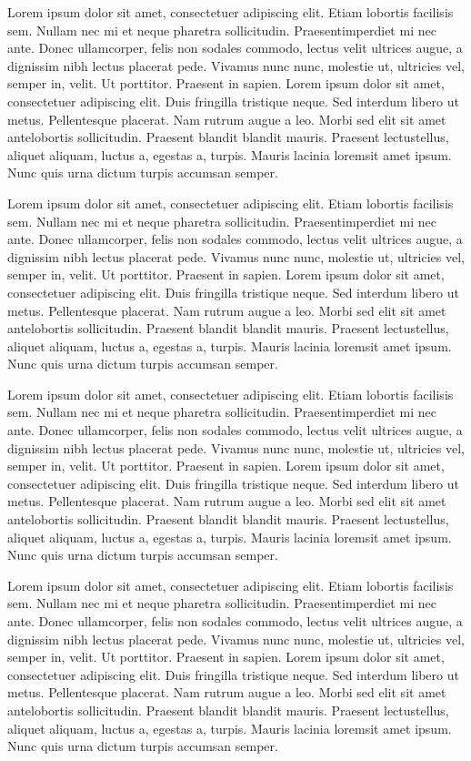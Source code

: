 Lorem ipsum dolor sit amet, consectetuer adipiscing elit. Etiam lobortis facilisis sem. Nullam nec mi et neque pharetra sollicitudin. Praesentimperdiet mi nec ante. Donec ullamcorper, felis non sodales commodo, lectus velit ultrices augue, a dignissim nibh lectus placerat pede. Vivamus nunc nunc, molestie ut, ultricies vel, semper in, velit. Ut porttitor. Praesent in sapien. Lorem ipsum dolor sit amet, consectetuer adipiscing elit. Duis fringilla tristique neque. Sed interdum libero ut metus. Pellentesque placerat. Nam rutrum augue a leo. Morbi sed elit sit amet antelobortis sollicitudin. Praesent blandit blandit mauris. Praesent lectustellus, aliquet aliquam, luctus a, egestas a, turpis. Mauris lacinia loremsit amet ipsum. Nunc quis urna dictum turpis accumsan semper.

Lorem ipsum dolor sit amet, consectetuer adipiscing elit. Etiam lobortis facilisis sem. Nullam nec mi et neque pharetra sollicitudin. Praesentimperdiet mi nec ante. Donec ullamcorper, felis non sodales commodo, lectus velit ultrices augue, a dignissim nibh lectus placerat pede. Vivamus nunc nunc, molestie ut, ultricies vel, semper in, velit. Ut porttitor. Praesent in sapien. Lorem ipsum dolor sit amet, consectetuer adipiscing elit. Duis fringilla tristique neque. Sed interdum libero ut metus. Pellentesque placerat. Nam rutrum augue a leo. Morbi sed elit sit amet antelobortis sollicitudin. Praesent blandit blandit mauris. Praesent lectustellus, aliquet aliquam, luctus a, egestas a, turpis. Mauris lacinia loremsit amet ipsum. Nunc quis urna dictum turpis accumsan semper.

Lorem ipsum dolor sit amet, consectetuer adipiscing elit. Etiam lobortis facilisis sem. Nullam nec mi et neque pharetra sollicitudin. Praesentimperdiet mi nec ante. Donec ullamcorper, felis non sodales commodo, lectus velit ultrices augue, a dignissim nibh lectus placerat pede. Vivamus nunc nunc, molestie ut, ultricies vel, semper in, velit. Ut porttitor. Praesent in sapien. Lorem ipsum dolor sit amet, consectetuer adipiscing elit. Duis fringilla tristique neque. Sed interdum libero ut metus. Pellentesque placerat. Nam rutrum augue a leo. Morbi sed elit sit amet antelobortis sollicitudin. Praesent blandit blandit mauris. Praesent lectustellus, aliquet aliquam, luctus a, egestas a, turpis. Mauris lacinia loremsit amet ipsum. Nunc quis urna dictum turpis accumsan semper.

Lorem ipsum dolor sit amet, consectetuer adipiscing elit. Etiam lobortis facilisis sem. Nullam nec mi et neque pharetra sollicitudin. Praesentimperdiet mi nec ante. Donec ullamcorper, felis non sodales commodo, lectus velit ultrices augue, a dignissim nibh lectus placerat pede. Vivamus nunc nunc, molestie ut, ultricies vel, semper in, velit. Ut porttitor. Praesent in sapien. Lorem ipsum dolor sit amet, consectetuer adipiscing elit. Duis fringilla tristique neque. Sed interdum libero ut metus. Pellentesque placerat. Nam rutrum augue a leo. Morbi sed elit sit amet antelobortis sollicitudin. Praesent blandit blandit mauris. Praesent lectustellus, aliquet aliquam, luctus a, egestas a, turpis. Mauris lacinia loremsit amet ipsum. Nunc quis urna dictum turpis accumsan semper.

